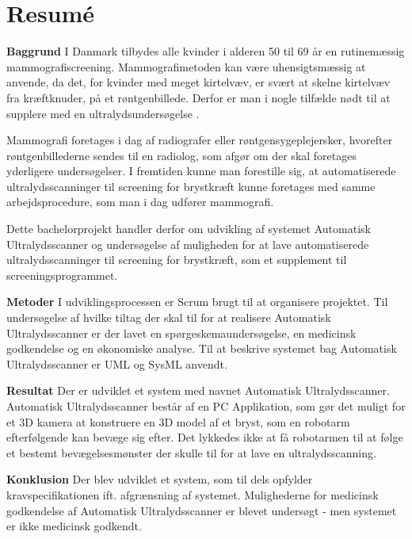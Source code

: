 \chapter{Resumé}
\textbf{Baggrund}
I Danmark tilbydes alle kvinder i alderen 50 til 69 år en rutinemæssig mammografiscreening. Mammografimetoden kan være uhensigtsmæssig at anvende, da det, for kvinder med meget kirtelvæv, er svært at skelne kirtelvæv fra kræftknuder, på et røntgenbillede. Derfor er man i nogle tilfælde nødt til at supplere med en ultralydsundersøgelse \cite{Ultralyd}.

Mammografi foretages i dag af radiografer eller røntgensygeplejersker, hvorefter røntgenbillederne sendes til en radiolog, som afgør om der skal foretages yderligere undersøgelser. I fremtiden kunne man forestille sig, at automatiserede ultralydsscanninger til screening for brystkræft kunne foretages med samme arbejdsprocedure, som man i dag udfører mammografi.

Dette bachelorprojekt handler derfor om udvikling af systemet Automatisk Ultralydsscanner og undersøgelse af muligheden for at lave automatiserede ultralydsscanninger til screening for brystkræft, som et supplement til screeningsprogrammet.

\textbf{Metoder}
I udviklingsprocessen er Scrum brugt til at organisere projektet. Til undersøgelse af hvilke tiltag der skal til for at realisere Automatisk Ultralydsscanner er der lavet en spørgeskemaundersøgelse, en medicinsk godkendelse og en økonomiske analyse. Til at beskrive systemet bag Automatisk Ultralydsscanner er UML og SysML anvendt. 

\textbf{Resultat}
Der er udviklet et system med navnet Automatisk Ultralydsscanner. Automatisk Ultralydsscanner består af en PC Applikation, som gør det muligt for et 3D kamera at konstruere en 3D model af et bryst, som en robotarm efterfølgende kan bevæge sig efter. Det lykkedes ikke at få robotarmen til at følge et bestemt bevægelsesmønster der skulle til for at lave en ultralydsscanning. 

\textbf{Konklusion}
Der blev udviklet et system, som til dels opfylder kravspecifikationen ift. afgrænsning af systemet. Mulighederne for medicinsk godkendelse af Automatisk Ultralydsscanner er blevet undersøgt - men systemet er ikke medicinsk godkendt.